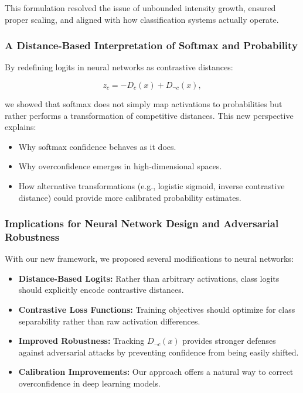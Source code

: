 This formulation resolved the issue of unbounded intensity growth, ensured proper scaling, and aligned with how classification systems actually operate.

\subsubsection{A Distance-Based Interpretation of Softmax and Probability}

By redefining logits in neural networks as contrastive distances:

\[
z_c = -D_c(x) + D_{\neg c}(x),
\]

we showed that softmax does not simply map activations to probabilities but rather performs a transformation of competitive distances. This new perspective explains:

\begin{itemize}
    \item Why softmax confidence behaves as it does.
    \item Why overconfidence emerges in high-dimensional spaces.
    \item How alternative transformations (e.g., logistic sigmoid, inverse contrastive distance) could provide more calibrated probability estimates.
\end{itemize}

\subsubsection{Implications for Neural Network Design and Adversarial Robustness}

With our new framework, we proposed several modifications to neural networks:

\begin{itemize}
    \item \textbf{Distance-Based Logits:} Rather than arbitrary activations, class logits should explicitly encode contrastive distances.
    \item \textbf{Contrastive Loss Functions:} Training objectives should optimize for class separability rather than raw activation differences.
    \item \textbf{Improved Robustness:} Tracking \( D_{\neg c}(x) \) provides stronger defenses against adversarial attacks by preventing confidence from being easily shifted.
    \item \textbf{Calibration Improvements:} Our approach offers a natural way to correct overconfidence in deep learning models.
\end{itemize}

